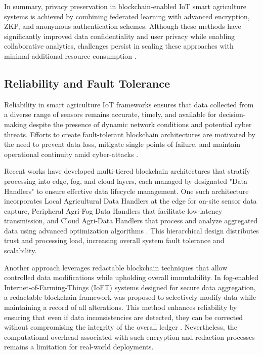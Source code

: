 \documentclass[12pt,onecolumn]{IEEEtran} %
\begin{document}
In summary, privacy preservation in blockchain-enabled IoT smart agriculture systems is achieved by combining federated learning with advanced encryption, ZKP, and anonymous authentication schemes. Although these methods have significantly improved data confidentiality and user privacy while enabling collaborative analytics, challenges persist in scaling these approaches with minimal additional resource consumption \cite{soy2025blockchainintegrationin}.

  \subsection{Reliability and Fault Tolerance}\label{subsec:reliability}
Reliability in smart agriculture IoT frameworks ensures that data collected from a diverse range of sensors remains accurate, timely, and available for decision-making despite the presence of dynamic network conditions and potential cyber threats. Efforts to create fault-tolerant blockchain architectures are motivated by the need to prevent data loss, mitigate single points of failure, and maintain operational continuity amid cyber-attacks \cite{aliyu2023blockchainbasedsmartfarm}.

Recent works have developed multi-tiered blockchain architectures that stratify processing into edge, fog, and cloud layers, each managed by designated "Data Handlers" to ensure effective data lifecycle management. One such architecture incorporates Local Agricultural Data Handlers at the edge for on-site sensor data capture, Peripheral Agri-Fog Data Handlers that facilitate low-latency transmission, and Cloud Agri-Data Handlers that process and analyze aggregated data using advanced optimization algorithms \cite{thiruvenkatasamy2025anonlinetool}. This hierarchical design distributes trust and processing load, increasing overall system fault tolerance and scalability.

Another approach leverages redactable blockchain techniques that allow controlled data modifications while upholding overall immutability. In fog-enabled Internet-of-Farming-Things (IoFT) systems designed for secure data aggregation, a redactable blockchain framework was proposed to selectively modify data while maintaining a record of all alterations. This method enhances reliability by ensuring that even if data inconsistencies are detected, they can be corrected without compromising the integrity of the overall ledger \cite{mishra2023redactableblockchainassistedsecure}. Nevertheless, the computational overhead associated with such encryption and redaction processes remains a limitation for real-world deployments.
\end{document}

